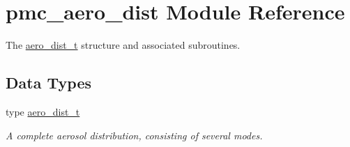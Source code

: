 \hypertarget{namespacepmc__aero__dist}{}\section{pmc\+\_\+aero\+\_\+dist Module Reference}
\label{namespacepmc__aero__dist}


The \mbox{\hyperlink{structpmc__aero__dist_1_1aero__dist__t}{aero\+\_\+dist\+\_\+t}} structure and associated subroutines.  


\subsection*{Data Types}
\begin{DoxyCompactItemize}
\item 
type \mbox{\hyperlink{structpmc__aero__dist_1_1aero__dist__t}{aero\+\_\+dist\+\_\+t}}
\begin{DoxyCompactList}\small\item\em A complete aerosol distribution, consisting of several modes. \end{DoxyCompactList}\end{DoxyCompactItemize}
